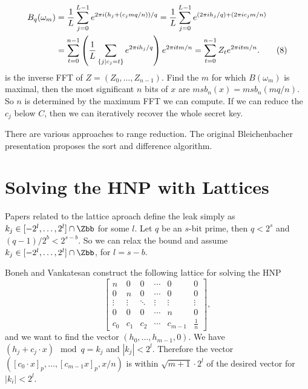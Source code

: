 \begin{align}
    B_q(\omega_m) 
    &= \frac{1}{L} \sum_{j=0}^{L-1} e^{2\pi i (h_j + (c_j m q / n))/q} 
    = \frac{1}{L} \sum_{j=0}^{L-1} e^{(2\pi i h_j / q) + (2\pi i c_j m / n)} \notag \\
    &= \sum_{t=0}^{n-1} \left( \frac{1}{L} \sum_{\substack{\{j \mid c_j = t\}}} e^{2\pi i h_j / q} \right) e^{2\pi i t m / n} 
    = \sum_{t=0}^{n-1} Z_t e^{2\pi i t m / n}. \tag{8}
\end{align}
is the inverse FFT of $Z = (Z_0, \ldots, Z_{n-1})$. Find the $m$ for which $B(\omega_m)$ is maximal, then the most significant $n$ bits of $x$ are $msb_n(x) = msb_n(mq/n)$. So $n$ is determined by the maximum FFT we can compute. If we can reduce the $c_j$ below $C$, then we can iteratively recover the whole secret key.


There are various approaches to range reduction. The original Bleichenbacher presentation proposes the sort and difference algorithm.

\begin{definition}
    
\end{definition}

\begin{definition}[4-Sum]
    
\end{definition}

\newpage
\section{Solving the HNP with Lattices}

Papers related to the lattice aproach define the leak simply as $k_j \in [-2^l, \ldots, 2^l] \cap \Zbb$ for some $l$. Let $q$ be an $s$-bit prime, then $q < 2^{s}$ and $(q-1)/2^{b} < 2^{s-b}$. So we can relax the bound and assume $k_j \in [-2^l, \ldots, 2^l] \cap \Zbb$, for $l = s-b$.

Boneh and Vankatesan construct the following lattice for solving the HNP
\begin{equation}
    \begin{bmatrix}
    n & 0 & 0 & \cdots & 0 & 0 \\
    0 & n & 0 & \cdots & 0 & 0 \\
    \vdots & \vdots & \ddots & \vdots & \vdots & \vdots \\
    0 & 0 & 0 & \cdots & n & 0 \\
    c_0 & c_1 & c_2 & \cdots & c_{m-1} & \frac{1}{n}
    \end{bmatrix},
\end{equation}
and we want to find the vector $(h_0, \ldots, h_{m-1}, 0)$. We have $(h_j + c_j \cdot x) \mod{q} = k_j$ and  $ |k_j|< 2^l$. Therefore the vector $([c_0 \cdot x]_p, \dots, [c_{m-1}x]_p, x/n)$ is within $\sqrt{m+1}\cdot 2^l$ of the desired vector for $|k_i| < 2^l$. 

